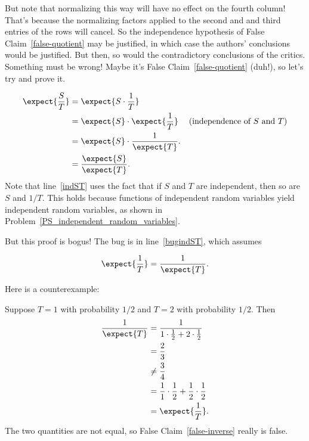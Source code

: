 But note that normalizing this way will have no effect on the fourth
column!  That's because the normalizing factors applied to the second and
and third entries of the rows will cancel.  So the independence hypothesis
of False Claim~\ref{false-quotient} may be justified, in which case the
authors' conclusions would be justified.  But then, so would the
contradictory conclusions of the critics.  Something must be wrong!  Maybe
it's False Claim~\ref{false-quotient} (duh!), so let's try and prove it.

\begin{falseproof}
\begin{align}
\expect{\frac{S}{T}} & = \expect{S \cdot \frac{1}{T}} \notag\\
       & = \expect{S} \cdot \expect{\frac{1}{T}} & \text{(independence of $S$
       and $T$)}\label{indST}\\
      & = \expect{S} \cdot \frac{1}{\expect{T}}. \label{bugindST}\\
      & = \frac{\expect{S}}{\expect{T}}.\notag
\end{align}
Note that line~\eqref{indST} uses the fact that if $S$ and $T$ are
independent, then so are $S$ and $1/T$.  This holds because functions of
independent random variables yield independent random variables, as shown
in Problem~\ref{PS_independent_random_variables}.

\end{falseproof}

But this proof is bogus!  The bug is in line~\eqref{bugindST}, which assumes
\begin{falsethm}\label{false-inverse}
\[
\expect{\frac{1}{T}} =  \frac{1}{\expect{T}}.
\]
\end{falsethm}
Here is a counterexample:
\begin{example*}
Suppose $T=1$ with probability $1/2$ and $T= 2$ with probability $1/2$.
Then
\begin{align*}
\frac{1}{\expect{T}}
    & = \frac{1}{1 \cdot \frac{1}{2} + 2 \cdot \frac{1}{2}}\\
    & =  \frac{2}{3}\\
    & \neq  \frac{3}{4}\\
    & = \frac{1}{1} \cdot \frac{1}{2} + \frac{1}{2} \cdot \frac{1}{2}\\
    & =  \expect{\frac{1}{T}}.
\end{align*}
The two quantities are not equal, so False Claim~\ref{false-inverse}
really is false.
\end{example*}


